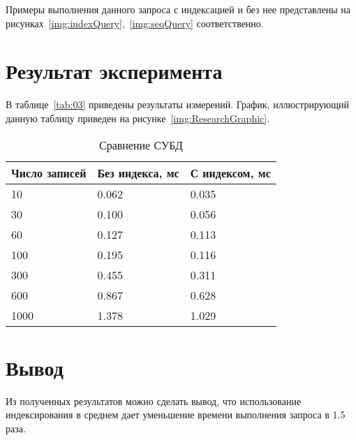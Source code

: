 Примеры выполнения данного запроса с индексацией и без нее представлены на
рисунках~\ref{img:indexQuery},~\ref{img:seqQuery} соответственно.


\section{Результат эксперимента}

В таблице~\ref{tab:03} приведены результаты измерений. График, иллюстрирующий
данную таблицу приведен на рисунке~\ref{img:ResearchGraphic}.

\begin{table}[ht!]
\captionsetup{format=hang,justification=raggedright,
              singlelinecheck=off,width=12cm}
\centering
\caption{Сравнение СУБД\label{tab:02}}
\begin{tabular}[Hc]{|p{3cm}|p{3cm}|p{3cm}|}
    \hline
    \multicolumn{1}{|c}{\textbf{Число записей}} &
    \multicolumn{1}{|c|}{\textbf{Без индекса, мс}} &
    \multicolumn{1}{c|}{\textbf{С индексом, мс}}\\
    \hline
    10   & 0.062 & 0.035 \\
    \hline
    30   & 0.100 & 0.056 \\
    \hline
    60   & 0.127 & 0.113 \\
    \hline

    100  & 0.195 & 0.116 \\
    \hline
    300  & 0.455 & 0.311 \\
    \hline
    600  & 0.867 & 0.628 \\
    \hline
    1000 & 1.378 & 1.029 \\
    \hline
\end{tabular}
\end{table}


\section*{Вывод}

Из полученных результатов можно сделать вывод, что использование индексирования
в среднем дает уменьшение времени выполнения запроса в 1.5 раза.
